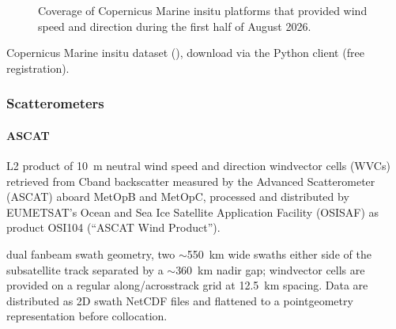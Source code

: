 \documentclass[a4paper,10pt,english]{sphinxmanual}
\begin{document}
\begin{figure}[htbp]
\centering
\capstart

\noindent{}
\caption{Coverage of Copernicus Marine in\sphinxhyphen{}situ platforms that provided wind speed and direction during the first half of August 2026.}\label{\detokenize{05_reference_datasets:fig-in-situ-wind-coverage}}\end{figure}

\sphinxAtStartPar
{}

\sphinxAtStartPar
Copernicus Marine in\sphinxhyphen{}situ dataset (), download via the  Python client (free registration).


\subsubsection{Scatterometers}
\label{\detokenize{05_reference_datasets:scatterometers}}

\paragraph{ASCAT}
\label{\detokenize{05_reference_datasets:ascat}}
\sphinxAtStartPar
{}

\sphinxAtStartPar
L2 product of 10 m neutral wind speed and direction wind\sphinxhyphen{}vector cells (WVCs) retrieved from C\sphinxhyphen{}band backscatter measured by the Advanced Scatterometer (ASCAT) aboard MetOp\sphinxhyphen{}B and MetOp\sphinxhyphen{}C, processed and distributed by EUMETSAT’s Ocean and Sea Ice Satellite Application Facility (OSI\sphinxhyphen{}SAF) as product OSI\sphinxhyphen{}104 (“ASCAT Wind Product”).

\sphinxAtStartPar
{}

\sphinxAtStartPar
dual fan\sphinxhyphen{}beam swath geometry, two \(\sim\)550 km wide swaths either side of the sub\sphinxhyphen{}satellite track separated by a \(\sim\)360 km nadir gap; wind\sphinxhyphen{}vector cells are provided on a regular along\sphinxhyphen{}/across\sphinxhyphen{}track grid at 12.5 km spacing. Data are distributed as 2\sphinxhyphen{}D swath NetCDF files and flattened to a point\sphinxhyphen{}geometry representation before collocation.
\end{document}
